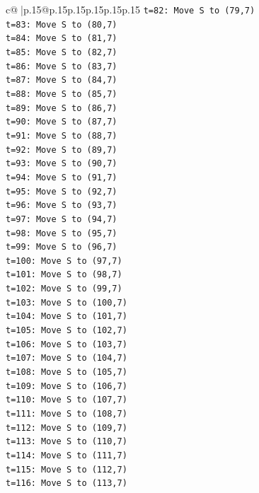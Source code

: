\documentclass{article}
\begin{document}
{\begin{supertabular}{c@{$\;$}|p{.15\linewidth}@{}p{.15\linewidth}p{.15\linewidth}p{.15\linewidth}p{.15\linewidth}p{.15\linewidth}}
{{{\texttt{t=82: Move S to (79,7)} \\
\texttt{t=83: Move S to (80,7)} \\
\texttt{t=84: Move S to (81,7)} \\
\texttt{t=85: Move S to (82,7)} \\
\texttt{t=86: Move S to (83,7)} \\
\texttt{t=87: Move S to (84,7)} \\
\texttt{t=88: Move S to (85,7)} \\
\texttt{t=89: Move S to (86,7)} \\
\texttt{t=90: Move S to (87,7)} \\
\texttt{t=91: Move S to (88,7)} \\
\texttt{t=92: Move S to (89,7)} \\
\texttt{t=93: Move S to (90,7)} \\
\texttt{t=94: Move S to (91,7)} \\
\texttt{t=95: Move S to (92,7)} \\
\texttt{t=96: Move S to (93,7)} \\
\texttt{t=97: Move S to (94,7)} \\
\texttt{t=98: Move S to (95,7)} \\
\texttt{t=99: Move S to (96,7)} \\
\texttt{t=100: Move S to (97,7)} \\
\texttt{t=101: Move S to (98,7)} \\
\texttt{t=102: Move S to (99,7)} \\
\texttt{t=103: Move S to (100,7)} \\
\texttt{t=104: Move S to (101,7)} \\
\texttt{t=105: Move S to (102,7)} \\
\texttt{t=106: Move S to (103,7)} \\
\texttt{t=107: Move S to (104,7)} \\
\texttt{t=108: Move S to (105,7)} \\
\texttt{t=109: Move S to (106,7)} \\
\texttt{t=110: Move S to (107,7)} \\
\texttt{t=111: Move S to (108,7)} \\
\texttt{t=112: Move S to (109,7)} \\
\texttt{t=113: Move S to (110,7)} \\
\texttt{t=114: Move S to (111,7)} \\
\texttt{t=115: Move S to (112,7)} \\
\texttt{t=116: Move S to (113,7)} \\
}}}
\end{supertabular}}
\end{document}
